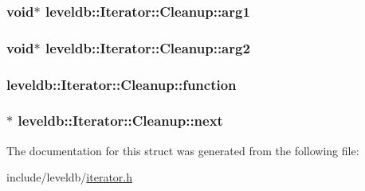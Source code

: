 \subsubsection[{arg1}]{\setlength{\rightskip}{0pt plus 5cm}void$\ast$ leveldb\+::\+Iterator\+::\+Cleanup\+::arg1}\label{structleveldb_1_1_iterator_1_1_cleanup_a4f60a8f4786f1d8fbcf5b2039c8e39bc}
\hypertarget{structleveldb_1_1_iterator_1_1_cleanup_a957ccaa98c380048c59658542e419e89}{}
\subsubsection[{arg2}]{\setlength{\rightskip}{0pt plus 5cm}void$\ast$ leveldb\+::\+Iterator\+::\+Cleanup\+::arg2}\label{structleveldb_1_1_iterator_1_1_cleanup_a957ccaa98c380048c59658542e419e89}
\hypertarget{structleveldb_1_1_iterator_1_1_cleanup_aa8a4f34ac312e21d83db4457bba40301}{}
\subsubsection[{function}]{ leveldb\+::\+Iterator\+::\+Cleanup\+::function}\label{structleveldb_1_1_iterator_1_1_cleanup_aa8a4f34ac312e21d83db4457bba40301}
\hypertarget{structleveldb_1_1_iterator_1_1_cleanup_a9dea82023286b2ff15a1657bc22ed63c}{}
\subsubsection[{next}]{$\ast$ leveldb\+::\+Iterator\+::\+Cleanup\+::next}\label{structleveldb_1_1_iterator_1_1_cleanup_a9dea82023286b2ff15a1657bc22ed63c}


The documentation for this struct was generated from the following file\+:\begin{DoxyCompactItemize}
\item 
include/leveldb/\hyperlink{iterator_8h}{iterator.\+h}\end{DoxyCompactItemize}
